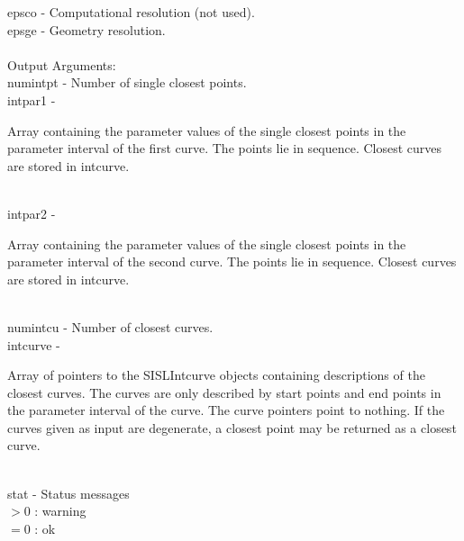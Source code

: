         \>\>    {\fov epsco}    \> - \> Computational resolution (not used).\\
        \>\>    {\fov epsge}    \> - \> Geometry resolution.\\
\\
        \>Output Arguments:\\
        \>\>    {\fov numintpt}\> - \>  Number of single closest points.\\
        \>\>    {\fov intpar1}  \> - \> \begin{minipg2}
                        Array containing the parameter values of the
                        single closest points in the parameter
                        interval of the first curve. The points lie in sequence.
                        Closest curves are stored in intcurve.
                                \end{minipg2}\\[0.8ex]
        \>\>    {\fov intpar2}  \> - \> \begin{minipg2}
                        Array containing the parameter values of the
                        single closest points in the parameter
                        interval of the second curve. The points lie in sequence.
                        Closest curves are stored in intcurve.
                                \end{minipg2}\\[0.8ex]
        \>\>    {\fov numintcu}\> - \>Number of closest curves.\\
        \>\>    {\fov intcurve}\> - \>  \begin{minipg2}
                        Array of pointers to the SISLIntcurve objects
                        containing descriptions of the closest
                        curves. The curves are only described by
                        start points and end points in
                        the parameter interval of the curve. The curve
                        pointers point to nothing.
                        If the curves given as input are
                        degenerate, a closest point may be returned as
                        a closest curve.
                                \end{minipg2}\\[0.8ex]
\newpagetabs
        \>\>    {\fov stat}     \> - \> Status messages\\
                \>\>\>\>\>              $> 0$   : warning\\
                \>\>\>\>\>              $= 0$   : ok\\
